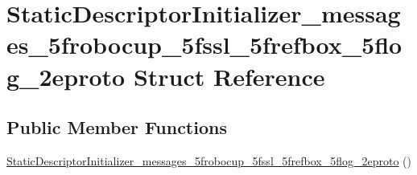 \hypertarget{struct_static_descriptor_initializer__messages__5frobocup__5fssl__5frefbox__5flog__2eproto}{\section{Static\-Descriptor\-Initializer\-\_\-messages\-\_\-5frobocup\-\_\-5fssl\-\_\-5frefbox\-\_\-5flog\-\_\-2eproto Struct Reference}
\label{struct_static_descriptor_initializer__messages__5frobocup__5fssl__5frefbox__5flog__2eproto}
}
\subsection*{Public Member Functions}
\begin{DoxyCompactItemize}
\item 
\hyperlink{struct_static_descriptor_initializer__messages__5frobocup__5fssl__5frefbox__5flog__2eproto_a5e237328736f9eebff8e2dccfb2847f0}{Static\-Descriptor\-Initializer\-\_\-messages\-\_\-5frobocup\-\_\-5fssl\-\_\-5frefbox\-\_\-5flog\-\_\-2eproto} ()
\end{DoxyCompactItemize}


